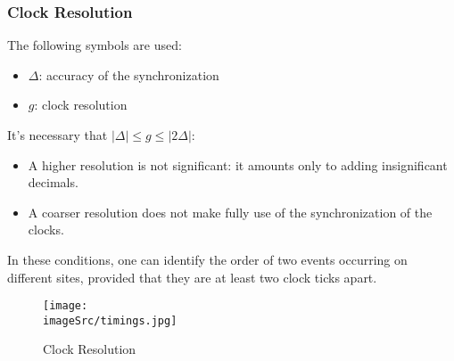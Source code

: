 \documentclass[../main.tex]{subfiles}
\begin{document}
\subsubsection{Clock Resolution}
The following symbols are used:
\begin{itemize}
	\item $\Delta$: accuracy of the synchronization
	\item $g$: clock resolution
\end{itemize}
It's necessary that $| \Delta | \leq g \leq | 2 \Delta |$:
\begin{itemize}
	\item A higher resolution is not significant: it amounts only to adding insignificant decimals.
	\item A coarser resolution does not make fully use of the synchronization of the clocks.
\end{itemize}
In these conditions, one can identify the order of two events occurring on different sites, provided that they are at least two clock ticks apart.

\begin{figure}[h!]
    \centering
    \texttt{[image: \\imageSrc/timings.jpg]}
    \caption{Clock Resolution}
    \label{mcosii}
\end{figure}
\end{document}
